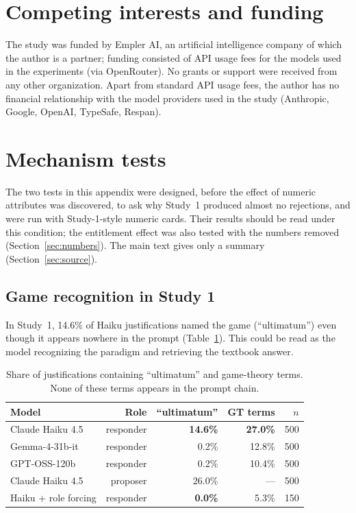 \documentclass[11pt]{article}
\begin{document}
\section*{Competing interests and funding}

The study was funded by Empler AI, an artificial intelligence company of which the author is a partner; funding consisted of API usage fees for the models used in the experiments (via OpenRouter). No grants or support were received from any other organization. Apart from standard API usage fees, the author has no financial relationship with the model providers used in the study (Anthropic, Google, OpenAI, TypeSafe, Respan).


\appendix

\section{Mechanism tests}\label{sec:mechanism}

The two tests in this appendix were designed, before the effect of numeric attributes was discovered, to ask why Study~1 produced almost no rejections, and were run with Study-1-style numeric cards. Their results should be read under this condition; the entitlement effect was also tested with the numbers removed (Section~\ref{sec:numbers}). The main text gives only a summary (Section~\ref{sec:source}).

\subsection{Game recognition in Study 1}

In Study~1, 14.6\% of Haiku justifications named the game (``ultimatum'') even though it appears nowhere in the prompt (Table~\ref{tab:gamerecog}). This could be read as the model recognizing the paradigm and retrieving the textbook answer.

\begin{table}[H]
\centering
\caption{Share of justifications containing ``ultimatum'' and game-theory terms. None of these terms appears in the prompt chain.}
\label{tab:gamerecog}
\begin{tabular}{lrrrr}
\toprule
Model & Role & ``ultimatum'' & GT terms & $n$ \\
\midrule
Claude Haiku 4.5 & responder & \textbf{14.6\%} & \textbf{27.0\%} & 500 \\
Gemma-4-31b-it   & responder & 0.2\%           & 12.8\%          & 500 \\
GPT-OSS-120b     & responder & 0.2\%           & 10.4\%          & 500 \\
\midrule
Claude Haiku 4.5 & proposer  & 26.0\%          & ---             & 500 \\
\midrule
Haiku + role forcing & responder & \textbf{0.0\%} & 5.3\%       & 150 \\
\bottomrule
\end{tabular}
\end{table}
\end{document}
